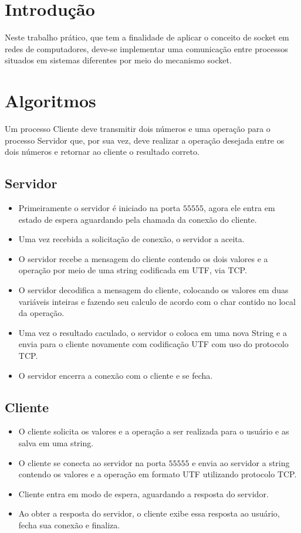 \documentclass[brazil, a4paper,12pt]{article}
\begin{document}


\section{Introdução}
Neste trabalho prático, que tem a finalidade de aplicar o conceito de socket em redes de computadores, deve-se implementar uma comunicação entre processos situados em sistemas diferentes por meio do mecanismo socket.


\section{Algoritmos}
Um processo Cliente deve transmitir dois números e uma operação para o processo Servidor que, por sua vez, deve realizar a operação desejada entre os dois números e retornar ao cliente o resultado correto.

\subsection{Servidor}
\begin{itemize}
 	\item Primeiramente o servidor é iniciado na porta $55555$, agora ele entra em estado de espera aguardando pela chamada da conexão do cliente.
	\item Uma vez recebida a solicitação de conexão, o servidor a aceita.
	\item O servidor recebe a mensagem do cliente contendo os dois valores e a operação por meio de uma string codificada em UTF, via TCP.
	\item O servidor decodifica a mensagem do cliente, colocando os valores em duas variáveis inteiras e fazendo seu calculo de acordo com o char contido no local da operação.
	\item Uma vez o resultado caculado, o servidor o coloca em uma nova String e a envia para o cliente novamente com codificação UTF com uso do protocolo TCP.
	\item O servidor encerra a conexão com o cliente e se fecha.
\end{itemize}

\subsection{Cliente}
\begin{itemize}
	\item O cliente solicita os valores e a operação a ser realizada para o usuário e as salva em uma string.
	\item O cliente se conecta ao servidor na porta $55555$ e envia ao servidor a string contendo os valores e a operação em formato UTF utilizando protocolo TCP.
	\item Cliente entra em modo de espera, aguardando a resposta do servidor. 
	\item Ao obter a resposta do servidor, o cliente exibe essa resposta ao usuário, fecha sua conexão e finaliza.
	
\end{itemize}
\end{document}

